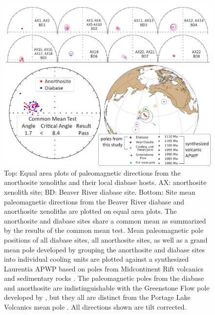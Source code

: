 \documentclass[draft]{agujournal2019}
\begin{document}
\begin{figure}
\noindent\includegraphics[width=\textwidth]{Direction_pairs.pdf}
\caption{\small{Top: Equal area plots of paleomagnetic directions from the anorthosite xenoliths and their local diabase hosts. AX: anorthosite xenolith site; BD: Beaver River diabase site. Bottom: Site mean paleomagnetic directions from the Beaver River diabase and anorthosite xenoliths are plotted on equal area plots. The anorthosite and diabase sites share a common mean as summarized by the results of the  common mean test. Mean paleomagnetic pole positions of all diabase sites, all anorthosite sites, as well as a grand mean pole developed by grouping the anorthosite and diabase sites into individual cooling units are plotted against a synthesized Laurentia APWP based on poles from Midcontinent Rift volcanics and sedimentary rocks \cite{Swanson-Hysell2019a}. The paleomagnetic poles from the diabase and anorthosite are indistinguishable with the Greenstone Flow pole developed by , but they all are distinct from the Portage Lake Volcanics mean pole \cite{Swanson-Hysell2019a}. All directions shown are tilt corrected.}}
\label{fig:Direction_pairs}
\end{figure}
\end{document}
